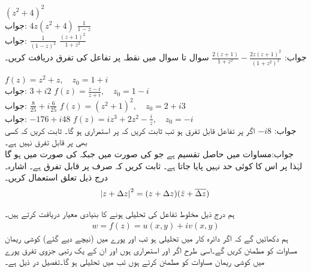 \quad
$(z^2+4)^2$\\
جواب:\quad
$4z(z^2+4)$
\quad
$\tfrac{1}{1-z}$\\
جواب:\quad
$\tfrac{1}{(1-z)^2}$
\quad
$\tfrac{(z+1)^2}{1+z^2}$\\
جواب:\quad
$\tfrac{2(z+1)}{1+z^2}-\tfrac{2z(z+1)^2}{(1+z^2)^2}$
سوال  تا سوال  میں نقطہ  پر تفاعل کی تفرق دریافت کریں۔

\quad
$f(z)=z^2+z,\quad z_0=1+i$\\
جواب:\quad
$3+i2$
\quad
$f(z)=\tfrac{z-i}{z+i},\quad z_0=1-i$\\
جواب:\quad
$\tfrac{8}{25}+i\tfrac{6}{25}$
\quad
$f(z)=(z^2+1)^2,\quad z_0=2+i3$\\
جواب:\quad
$-176+i48$
\quad
$f(z)=iz^3+2z^2-\tfrac{i}{z},\quad z_0=-i$\\
جواب:\quad
$-i8$
\quad
اگر  پر تفاعل  قابل تفرق ہو تب ثابت کریں کہ  پر  استمراری ہو گا۔
\quad
ثابت کریں کہ  کسی بھی  پر قابل تفرق نہیں ہے۔\\
جواب:\quad مساوات  میں حاصل تقسیم  ہے جو  کی صورت میں  جبکہ  کی صورت میں  ہو گا لہٰذا  پر اس کا کوئی حد نہیں پایا جاتا ہے۔
\quad
ثابت کریں کہ  صرف  پر قابل تفرق ہے۔ اشارہ۔ درج ذیل تعلق استعمال کریں۔
\begin{align*}
\abs{z+\Delta z}^2=(z+\Delta z)(\bar{z}+\overline{\Delta z})
\end{align*}

ہم درج ذیل مخلوط تفاعل کی تحلیلی ہونے  کا بنیادی معیار دریافت کرتے ہیں۔
\begin{align}\label{مساوات_مخلوط_کوشی_ریمان_ثبوت_الف}
w=f(z)=u(x,y)+iv(x,y)
\end{align}
ہم دکھائیں گے کہ اگر دائرہ کار  میں  تحلیلی ہو تب  اور  پورے  میں (نیچے دیے گئے) کوشی ریمان مساوات کو مطمئن کریں گے۔اسی طرح اگر   اور  استمراری ہوں اور ان کے یک رتبی جزوی تفرق پورے  میں   کوشی ریمان مساوات   کو مطمئن کرتے ہوں تب  میں  تحلیلی ہو گا۔تفصیل در ذیل ہے۔ 


